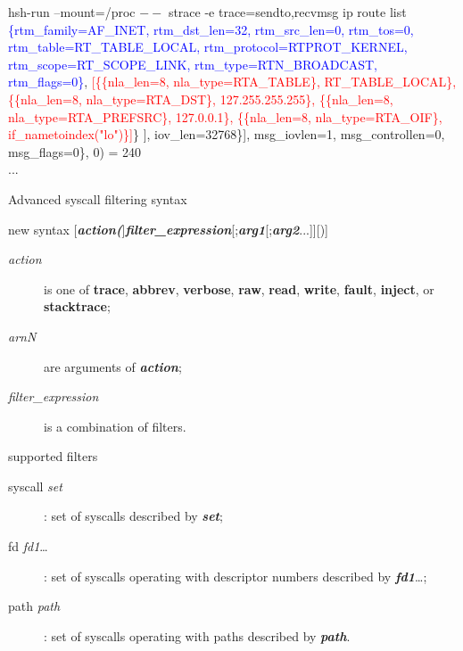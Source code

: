\documentclass[unicode]{beamer}
\begin{document}
\begin{frame}[fragile]{\small hsh-run --mount=/proc $--$ strace -e trace=sendto,recvmsg ip route list}
{{ \textcolor{blue}{\{rtm\_family=AF\_INET, rtm\_dst\_len=32, rtm\_src\_len=0, rtm\_tos=0, rtm\_table=RT\_TABLE\_LOCAL, rtm\_protocol=RTPROT\_KERNEL, rtm\_scope=RT\_SCOPE\_LINK, rtm\_type=RTN\_BROADCAST, rtm\_flags=0\}},
  \textcolor{red}{[\{\{nla\_len=8, nla\_type=RTA\_TABLE\}, RT\_TABLE\_LOCAL\}, \{\{nla\_len=8, nla\_type=RTA\_DST\}, 127.255.255.255\}, \{\{nla\_len=8, nla\_type=RTA\_PREFSRC\}, 127.0.0.1\}, \{\{nla\_len=8, nla\_type=RTA\_OIF\}, if\_nametoindex("lo")\}]}\}}
], iov\_len=32768\}], msg\_iovlen=1, msg\_controllen=0, msg\_flags=0\}, 0) = 240 \\
...
}
\end{frame}

\begin{frame}[fragile]{Advanced syscall filtering syntax}
\begin{block}{new syntax}
[\textbf{\textit{action(}}]\textbf{\textit{filter\_expression}}[;\textbf{\textit{arg1}}[;\textbf{\textit{arg2}}...]][)]
\begin{description}
\item[\textit{action}] is one of \textbf{trace}, \textbf{abbrev}, \textbf{verbose},
\textbf{raw}, \textbf{read}, \textbf{write}, \textbf{fault},
\textbf{inject}, or \textbf{stacktrace};
\item[\textit{arnN}] are arguments of \textbf{\textit{action}};
\item[\textit{filter\_expression}] is a combination of filters.
\end{description}
\end{block}
\begin{block}{supported filters}
\begin{description}
\item[syscall \textit{set}]: set of syscalls described by \textbf{\textit{set}};
\item[fd \textit{fd1}\dots]: set of syscalls operating with descriptor numbers
described by \textbf{\textit{fd1}}\dots;
\item[path \textit{path}]: set of syscalls operating with paths
described by \textbf{\textit{path}}.
\end{description}
\end{block}
\end{frame}
\end{document}

